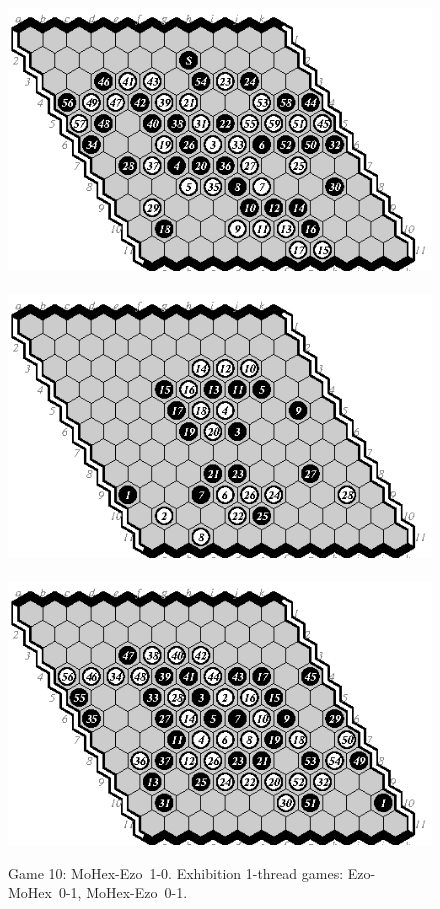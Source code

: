 \documentclass{icga}
\def\Eo{\mbox{\sc Ezo}}
\def\Mx{\mbox{\sc MoHex}}
\begin{document}
\begin{figure}[hbp]
\hspace*{-2cm}\
\includegraphics[scale=1.2]{games/pix/10-me-completion.eps}\hspace*{-2cm}\
\includegraphics[scale=1.2]{games/pix/em-friendly-0-1.eps}\hspace*{-2cm}\
\includegraphics[scale=1.2]{games/pix/me-friendly-0-1.eps}
\caption{Game 10: \Mx-\Eo\ 1-0. Exhibition 1-thread games: \Eo-\Mx\ 0-1, \Mx-\Eo\ 0-1.}
\end{figure}
\end{document}
